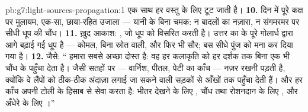 \begin{solution}{pb:g7:light-sources-propagation:1}
एक साथ हर वस्तु के लिए टूट जाती है।
\textbf{10.} दिन में पूरे कक्ष पर मुलायम, एक-सा, छाया-रहित उजाला ---
यानी  के बिना चमक: न बादलों का नज़ारा, न संगमरमर पर सीधी धूप
की चौंध।
\textbf{11.} ख़ुद आकाश: , जो धूप को विसरित करती है। उत्तर का
  के पूरे गोलार्ध द्वारा आगे बढ़ाई गई धूप है --- कोमल, बिना
स्रोत वाली, और फिर भी सौर; बस सीधे पुंज को मना कर दिया गया है।
\textbf{12.} जैसे: `` हमारा सबसे अच्छा दोस्त है: वह हर कलाकृति
को हर दर्शक तक बिना एक भी चौंध के पहुँचा देता है।  जैसी सतहों पर
--- वार्निश, पीतल, पेटी का काँच --- नज़र रखनी पड़ती है, क्योंकि वे
लैंपों को ठीक-ठीक अंदाज़ा लगाई जा सकने वाली सड़कों से आँखों तक पहुँचा
देती हैं। और हर काँच अपनी टोली के हिसाब से सेवा करता है: भीतर देखने के
लिए , चौंध तथा रोशनदान के लिए , और अँधेरे के लिए
।''
\end{solution}
